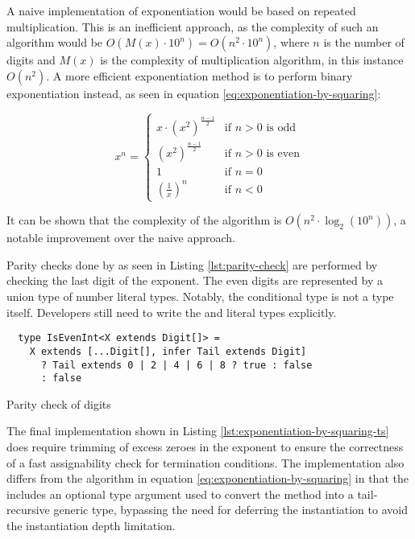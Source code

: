 A naive implementation of exponentiation would be based on repeated multiplication. This is an inefficient approach, as the complexity of such an algorithm would be $O(M(x) \cdot 10^n) = O(n^2 \cdot 10^n)$, where $n$ is the number of digits and $M(x)$ is the complexity of multiplication algorithm, in this instance $O(n^2)$. A more efficient exponentiation method is to perform binary exponentiation instead, as seen in equation \ref{eq:exponentiation-by-squaring}:

\begin{equation}\label{eq:exponentiation-by-squaring}
  x^n =
  \begin{cases}
    x \cdot (x^2)^\frac{n-1}{2} & \text{if } n > 0 \text{ is odd}  \\
    (x^2)^\frac{n-1}{2}         & \text{if } n > 0 \text{ is even} \\
    1                           & \text{if } n = 0                 \\
    (\frac{1}{x})^n             & \text{if } n < 0
  \end{cases}
\end{equation}

It can be shown that the complexity of the algorithm is $O(n^2 \cdot \log_2(10^n))$, a notable improvement over the naive approach.

Parity checks done by  as seen in Listing \ref{lst:parity-check} are performed by checking the last digit of the exponent. The even digits are represented by a union type of number literal types. Notably, the conditional type is not a type itself. Developers still need to write the  and  literal types explicitly.

\begin{listing}[ht!]
  \begin{verbatim}
  type IsEvenInt<X extends Digit[]> = 
    X extends [...Digit[], infer Tail extends Digit]
      ? Tail extends 0 | 2 | 4 | 6 | 8 ? true : false
      : false
  \end{verbatim}
  \caption{Parity check of digits}\label{lst:parity-check}
\end{listing}

The final implementation shown in Listing \ref{lst:exponentiation-by-squaring-ts} does require trimming of excess zeroes in the exponent to ensure the correctness of a fast assignability check for termination conditions. The implementation also differs from the algorithm in equation \ref{eq:exponentiation-by-squaring} in that the  includes an optional type argument  used to convert the method into a tail-recursive generic type, bypassing the need for deferring the instantiation to avoid the instantiation depth limitation.

